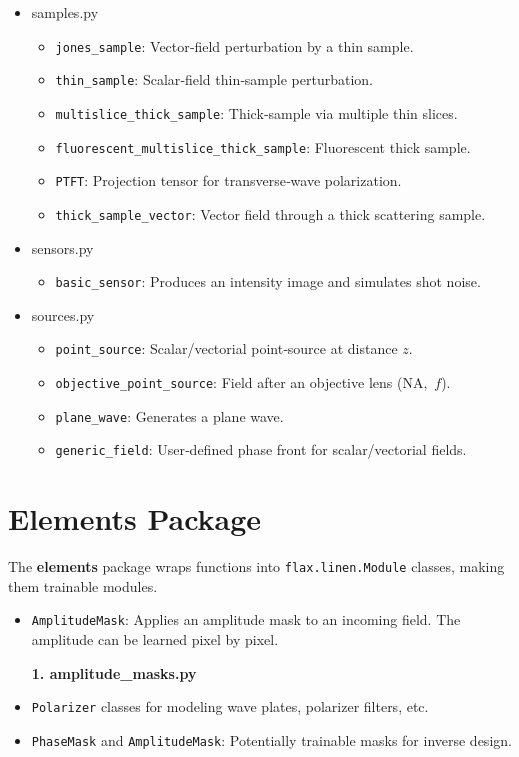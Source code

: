\documentclass[a4paper,12pt]{report}
\begin{document}
\begin{itemize}[itemsep=1em]
  \item[\large\bfseries 8.\ ] samples.py
    \begin{itemize}[itemsep=0.5em]
      \item \texttt{jones\_sample}: Vector‑field perturbation by a thin sample.
      \item \texttt{thin\_sample}: Scalar‑field thin‑sample perturbation.
      \item \texttt{multislice\_thick\_sample}: Thick‐sample via multiple thin slices.
      \item \texttt{fluorescent\_multislice\_thick\_sample}: Fluorescent thick sample.
      \item \texttt{PTFT}: Projection tensor for transverse‐wave polarization.
      \item \texttt{thick\_sample\_vector}: Vector field through a thick scattering sample.
    \end{itemize}

  \item[\large\bfseries 9.\ ] sensors.py
    \begin{itemize}[itemsep=0.5em]
      \item \texttt{basic\_sensor}: Produces an intensity image and simulates shot noise.
    \end{itemize}

  \item[\large\bfseries 10.\ ] sources.py
    \begin{itemize}[itemsep=0.5em]
      \item \texttt{point\_source}: Scalar/vectorial point‐source at distance \(z\).
      \item \texttt{objective\_point\_source}: Field after an objective lens (NA, \(f\)).
      \item \texttt{plane\_wave}: Generates a plane wave.
      \item \texttt{generic\_field}: User‑defined phase front for scalar/vectorial fields.
    \end{itemize}
\end{itemize}


\section{Elements Package}
The \textbf{elements} package wraps functions into \texttt{flax.linen.Module} classes, making them trainable modules.
\begin{itemize}

    \item \texttt{AmplitudeMask}: Applies an amplitude mask to an incoming field. The amplitude can be learned pixel by pixel.
    
    \vspace{1em}
    {\large \textbf{1. amplitude\_masks.py}}
    \item \texttt{Polarizer} classes for modeling wave plates, polarizer filters, etc.
    \item \texttt{PhaseMask} and \texttt{AmplitudeMask}: Potentially trainable masks for inverse design.
\end{itemize}
\end{document}
